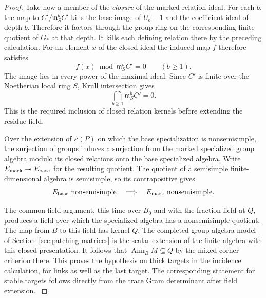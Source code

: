 \begin{proof}
Take now a member of the \emph{closure} of the marked relation ideal.
For each \(b\), the map to \(C'/\mathfrak m_S^bC'\)
kills the base image of \(U_b-1\) and the coefficient ideal
of depth \(b\). Therefore it factors through the group ring
on the corresponding finite quotient of \(G_*\) at that
depth. It kills each defining relation there by the preceding
calculation. For an element \(x\) of the closed ideal the induced map \(f\) therefore satisfies 
\[
 f(x)\bmod\mathfrak m_S^b C'=0\qquad(b\ge1).
\]
 The image lies in every power of the maximal ideal. Since \(C'\) is finite over the Noetherian local ring \(S\), Krull intersection gives
\[
 \bigcap_{b\ge1}\mathfrak m_S^b C'=0 .
\] This is the required inclusion of closed relation
kernels before extending the residue field.

Over the extension of \(\kappa(P)\) on which the base specialization is nonsemisimple, the surjection of groups induces
a surjection from the marked specialized group algebra modulo its
closed relations onto the base specialized algebra. Write \(E_{\rm mark}\twoheadrightarrow E_{\rm base}\) for the resulting quotient. The quotient of a semisimple finite-dimensional algebra is semisimple, so its contrapositive gives 
\[
 E_{\rm base}\text{ nonsemisimple}\quad\Longrightarrow\quad E_{\rm mark}\text{ nonsemisimple}.
\]
 

The common-field argument, this time over
\(B_0\) and with the fraction field at \(Q\), produces a field over which
the specialized algebra has a nonsemisimple quotient. The map from
\(B\) to this field has kernel \(Q\).
The completed group-algebra model of
Section~\ref{sec:patching-matrices} is the scalar extension of the
finite algebra with this closed presentation. It follows that
\(\operatorname{Ann}_B M\subseteq Q\) by the mixed-corner criterion
there. This proves the hypothesis on thick targets in the incidence
calculation, for links as well as the last target. The corresponding
statement for stable targets follows directly from the trace Gram
determinant after field extension. \label{cor:ordinary-closed-link-1}
\end{proof}
